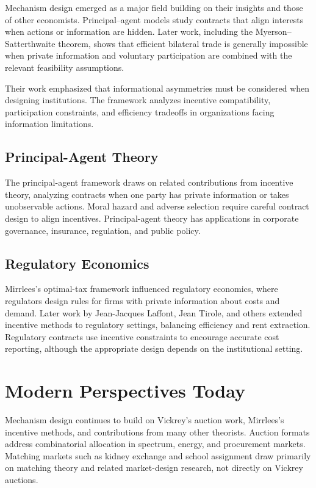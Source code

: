 Mechanism design emerged as a major field building on their insights and those
of other economists. Principal--agent models study contracts that align
interests when actions or information are hidden. Later work, including the
Myerson--Satterthwaite theorem, shows that efficient bilateral trade is
generally impossible when private information and voluntary participation are
combined with the relevant feasibility assumptions.

Their work emphasized that informational asymmetries must be considered when
designing institutions. The framework analyzes incentive compatibility,
participation constraints, and efficiency tradeoffs in organizations facing
information limitations.

\subsection*{Principal-Agent Theory}
The principal-agent framework draws on related contributions from incentive
theory, analyzing contracts when one party has private information or takes
unobservable actions. Moral hazard and adverse selection require careful contract
design to align incentives. Principal-agent theory has applications in corporate
governance, insurance, regulation, and public policy.

\subsection*{Regulatory Economics}
Mirrlees's optimal-tax framework influenced regulatory economics, where regulators
design rules for firms with private information about costs and demand. Later work
by Jean-Jacques Laffont, Jean Tirole, and others extended incentive methods to
regulatory settings, balancing efficiency and rent extraction. Regulatory
contracts use incentive constraints to encourage accurate cost reporting, although
the appropriate design depends on the institutional setting.

\section{Modern Perspectives Today}
Mechanism design continues to build on Vickrey's auction work, Mirrlees's
incentive methods, and contributions from many other theorists. Auction formats
address combinatorial allocation in spectrum, energy, and procurement markets.
Matching markets such as kidney exchange and school assignment draw primarily on
matching theory and related market-design research, not directly on Vickrey auctions.

